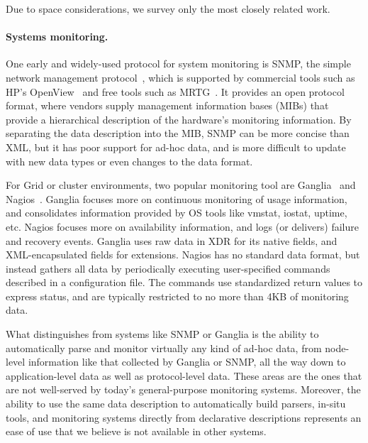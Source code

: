 
Due to space considerations, we survey only the most closely related work.

\paragraph*{Systems monitoring.}
One early and widely-used protocol for system monitoring is SNMP, the
simple network management protocol~\cite{snmprfc1157}, which is
supported by commercial tools such as HP's OpenView~\cite{openview}
and free tools such as MRTG~\cite{mrtg}. It provides an open protocol
format, where vendors supply  management information bases (MIBs)
that provide a hierarchical description of the hardware's monitoring
information. By separating the data description into the MIB, SNMP
can be more concise than XML, but it has poor support for ad-hoc
data, and is more difficult to update with new data types or even
changes to the data format.

For Grid or cluster environments, two popular monitoring tool are
Ganglia~\cite{ganglia} and Nagios~\cite{nagios}.  Ganglia focuses more
on continuous monitoring of usage information, and consolidates
information provided by OS tools like vmstat, iostat, uptime,
etc. Nagios focuses more on availability information, and logs (or
delivers) failure and recovery events. Ganglia uses raw data in XDR
for its native fields, and XML-encapsulated fields for extensions.
Nagios has no standard data format, but instead gathers all data by
periodically executing user-specified commands described in a
configuration file. The commands use standardized return values to
express status, and are typically restricted to no more than 4KB of
monitoring data.

What distinguishes \padsd{} from systems like SNMP or Ganglia is the
ability to automatically parse and monitor virtually any kind of
ad-hoc data, from node-level information like that collected by
Ganglia or SNMP, all the way down to application-level data as well as
protocol-level data. These areas are the ones that are not well-served
by today's general-purpose monitoring systems. Moreover, the ability
to use the same data description to automatically build parsers, 
in-situ tools, and monitoring systems directly from declarative
descriptions represents an ease of use that
we believe is not available in other systems.


